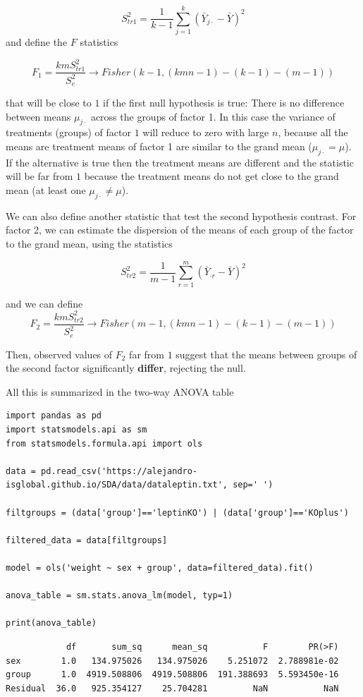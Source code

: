 \documentclass[
]{book}
\begin{document}
\[S^2_{tr1}=\frac{1}{k-1} \sum_{j=1}^k(\bar{Y}_{j\cdot}-\bar{Y})^2\]
and define the \(F\) statistics

\[F_1=\frac{kmS_{tr1}^2}{S_{e}^2} \rightarrow Fisher(k-1,(kmn-1)-(k-1)-(m-1))\]

that will be close to \(1\) if the first null hypothesis is true: There is no difference between means \(\mu_{j\cdot}\) across the groups of factor 1. In this case the variance of treatments (groups) of factor \(1\) will reduce to zero with large \(n\), because all the means are treatment means of factor 1 are similar to the grand mean (\(\mu_{j\cdot}=\mu\)). If the alternative is true then the treatment means are different and the statistic will be far from \(1\) because the treatment means do not get close to the grand mean (at least one \(\mu_{j\cdot}\neq\mu\)).

We can also define another statistic that test the second hypothesis contrast. For factor 2, we can estimate the dispersion of the means of each group of the factor to the grand mean, using the statistics

\[S^2_{tr2}=\frac{1}{m-1} \sum_{r=1}^m(\bar{Y}_{\cdot r}-\bar{Y})^2\]

and we can define \[F_2=\frac{kmS_{tr2}^2}{S_{e}^2}\rightarrow Fisher(m-1,(kmn-1)-(k-1)-(m-1))\]

Then, observed values of \(F_2\) far from \(1\) suggest that the means between groups of the second factor significantly \textbf{differ}, rejecting the null.

All this is summarized in the two-way ANOVA table

\begin{verbatim}
import pandas as pd
import statsmodels.api as sm
from statsmodels.formula.api import ols

data = pd.read_csv('https://alejandro-isglobal.github.io/SDA/data/dataleptin.txt', sep=' ')

filtgroups = (data['group']=='leptinKO') | (data['group']=='KOplus')

filtered_data = data[filtgroups]

model = ols('weight ~ sex + group', data=filtered_data).fit()

anova_table = sm.stats.anova_lm(model, typ=1)

print(anova_table)
\end{verbatim}

\begin{verbatim}
            df       sum_sq      mean_sq           F        PR(>F)
sex        1.0   134.975026   134.975026    5.251072  2.788981e-02
group      1.0  4919.508806  4919.508806  191.388693  5.593450e-16
Residual  36.0   925.354127    25.704281         NaN           NaN
\end{verbatim}
\end{document}
